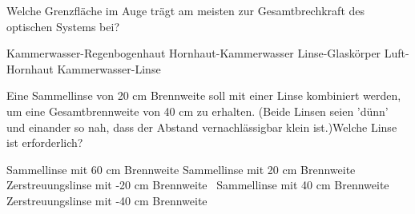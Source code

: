 \documentclass[11pt]{exam}
\begin{document}
\begin{questions}
\vspace{3mm}\question Welche Grenzfläche im Auge trägt am meisten zur Gesamtbrechkraft des optischen Systems bei?

\begin{choices}
	\choice Kammerwasser-Regenbogenhaut
	\choice Hornhaut-Kammerwasser
	\choice Linse-Glaskörper
	\choice Luft-Hornhaut
	\choice Kammerwasser-Linse
\end{choices}

\vspace{3mm}\question Eine Sammellinse von 20 cm Brennweite soll mit einer Linse kombiniert werden, um eine Gesamtbrennweite von 40 cm zu erhalten. (Beide Linsen seien ’dünn’ und einander so nah, dass der Abstand vernachlässigbar klein ist.)Welche Linse ist erforderlich?

\begin{choices}
	\choice Sammellinse mit 60 cm Brennweite
	\choice Sammellinse mit 20 cm Brennweite
	\choice Zerstreuungslinse mit -20 cm Brennweite
	\choice  Sammellinse mit 40 cm Brennweite
	\choice Zerstreuungslinse mit -40 cm Brennweite
\end{choices}

\vspace{3mm}\end{questions}
\end{document}
